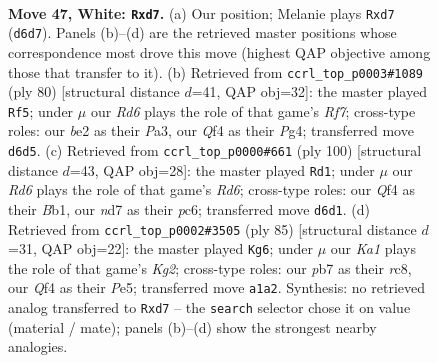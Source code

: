 \documentclass[11pt]{article}
\begin{document}
\clearpage

\begin{figure}[p]\centering
\begin{subfigure}{0.46\textwidth}\centering
\resizebox{\linewidth}{!}{%
\newchessgame
\chessboard[
  setfen={4k3/1p1n4/3R4/8/1r2PQ2/8/4b1PP/K7 w - - 1 47},
  showmover=false,
  pgfstyle=straightmove, color=movearrow, markmove={d6-d7}
]}
\caption{}
\end{subfigure}\hfill
\begin{subfigure}{0.46\textwidth}\centering
\resizebox{\linewidth}{!}{%
\newchessgame
\chessboard[
  setfen={7k/5R1n/8/p6P/6P1/P7/2r2PK1/8 w - - 0 41},
  showmover=false,
  pgfstyle=straightmove, color=movearrow, markmove={f7-f5}
]}
\caption{}
\end{subfigure}
\\[4pt]
\begin{subfigure}{0.46\textwidth}\centering
\resizebox{\linewidth}{!}{%
\newchessgame
\chessboard[
  setfen={8/1k3r2/2pR4/7P/5P2/pPb2K2/8/1B6 w - - 4 51},
  showmover=false,
  pgfstyle=straightmove, color=movearrow, markmove={d6-d1}
]}
\caption{}
\end{subfigure}\hfill
\begin{subfigure}{0.46\textwidth}\centering
\resizebox{\linewidth}{!}{%
\newchessgame
\chessboard[
  setfen={2R5/3R1pk1/8/4p1Bp/8/5qP1/7K/8 b - - 7 43},
  showmover=false,
  pgfstyle=straightmove, color=movearrow, markmove={g7-g6}
]}
\caption{}
\end{subfigure}
\caption{\textbf{Move 47, White: \texttt{Rxd7}.} (a) Our position; Melanie plays \texttt{Rxd7} (\texttt{d6d7}). Panels (b)--(d) are the retrieved master positions whose correspondence most drove this move (highest QAP objective among those that transfer to it). (b) Retrieved from \texttt{ccrl\_top\_p0003\#1089} (ply 80) [structural distance $d$=41, QAP obj=32]: the master played \texttt{Rf5}; under $\mu$ our \emph{Rd6} plays the role of that game's \emph{Rf7}; cross-type roles: our \emph{b}e2 as their \emph{P}a3, our \emph{Q}f4 as their \emph{P}g4; transferred move \texttt{d6d5}. (c) Retrieved from \texttt{ccrl\_top\_p0000\#661} (ply 100) [structural distance $d$=43, QAP obj=28]: the master played \texttt{Rd1}; under $\mu$ our \emph{Rd6} plays the role of that game's \emph{Rd6}; cross-type roles: our \emph{Q}f4 as their \emph{B}b1, our \emph{n}d7 as their \emph{p}c6; transferred move \texttt{d6d1}. (d) Retrieved from \texttt{ccrl\_top\_p0002\#3505} (ply 85) [structural distance $d$=31, QAP obj=22]: the master played \texttt{Kg6}; under $\mu$ our \emph{Ka1} plays the role of that game's \emph{Kg2}; cross-type roles: our \emph{p}b7 as their \emph{r}c8, our \emph{Q}f4 as their \emph{P}e5; transferred move \texttt{a1a2}. Synthesis: no retrieved analog transferred to \texttt{Rxd7} -- the \texttt{search} selector chose it on value (material / mate); panels (b)--(d) show the strongest nearby analogies.}
\label{fig:thought-m92}
\end{figure}
\end{document}
